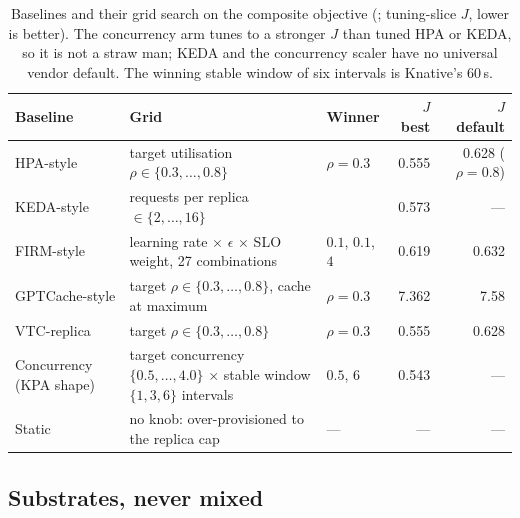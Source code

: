 \begin{table}[htbp]
\centering\tablefontsmall\setlength{\tabcolsep}{4pt}
\begin{tabularx}{\textwidth}{@{}>{\raggedright\arraybackslash}p{}>{\raggedright\arraybackslash}X>{\raggedright\arraybackslash}p{}rr@{}}
\toprule
\textbf{Baseline} & \textbf{Grid} & \textbf{Winner} & $J$ \textbf{best} & $J$ \textbf{default} \\
\midrule
HPA-style & target utilisation $\rho \in \{0.3, \dots, 0.8\}$ & $\rho = 0.3$ & 0.555 & 0.628 ($\rho = 0.8$) \\
KEDA-style & requests per replica $\in \{2, \dots, 16\}$ & 2.0 & 0.573 & --- \\
FIRM-style & learning rate $\times$ $\epsilon$ $\times$ SLO weight, 27 combinations & $0.1$, $0.1$, $4$ & 0.619 & 0.632 \\
GPTCache-style & target $\rho \in \{0.3, \dots, 0.8\}$, cache at maximum & $\rho = 0.3$ & 7.362 & 7.58 \\
VTC-replica & target $\rho \in \{0.3, \dots, 0.8\}$ & $\rho = 0.3$ & 0.555 & 0.628 \\
Concurrency (KPA shape) & target concurrency $\{0.5, \dots, 4.0\}$ $\times$ stable window $\{1, 3, 6\}$ intervals & $0.5$, $6$ & 0.543 & --- \\
Static & no knob: over-provisioned to the replica cap & --- & --- & --- \\
\bottomrule
\end{tabularx}
\caption{Baselines and their grid search on the composite objective
(; tuning-slice $J$, lower is better).
The concurrency arm tunes to a stronger $J$ than tuned HPA or KEDA, so it
is not a straw man; KEDA and the concurrency scaler have no universal
vendor default. The winning stable window of six intervals is Knative's
60\,s.}
\label{tab:baselines}
\end{table}

\subsection{Substrates, never mixed}
\label{sec:method-substrates}

